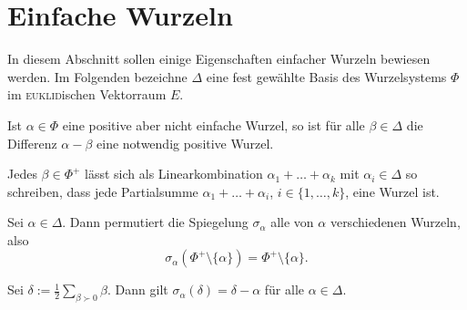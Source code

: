 \section{Einfache Wurzeln}

In diesem Abschnitt sollen einige Eigenschaften einfacher Wurzeln bewiesen werden.  
Im Folgenden bezeichne $\Delta$ eine fest gewählte Basis des Wurzelsystems $\Phi$ im \textsc{euklid}ischen Vektorraum $E$.

\begin{lem}
  Ist $\alpha \in \Phi$ eine positive aber nicht einfache Wurzel, so ist für alle $\beta \in \Delta$ die Differenz $\alpha - \beta$ eine notwendig positive Wurzel.
\end{lem}

\begin{cor}
  Jedes $\beta \in \Phi^+$ lässt sich als Linearkombination $\alpha_1 + \dots + \alpha_k$ mit $\alpha_i \in \Delta$ so schreiben, dass jede Partialsumme $\alpha_1 + \dots + \alpha_i$, $i \in \{1,\dots,k\}$, eine Wurzel ist.
\end{cor}

\begin{lem}
  Sei $\alpha \in \Delta$. 
  Dann permutiert die Spiegelung $\sigma_\alpha$ alle von $\alpha$ verschiedenen Wurzeln, also 
  \begin{displaymath}
    \sigma_\alpha(\Phi^+ \setminus \{\alpha\}) = \Phi^+ \setminus \{\alpha\}.
  \end{displaymath}
\end{lem}

\begin{cor}
  Sei $\delta := \tfrac{1}{2} \sum_{\beta \succ 0} \beta$.
  Dann gilt $\sigma_\alpha(\delta) = \delta - \alpha$ für alle $\alpha \in \Delta$.
\end{cor}
